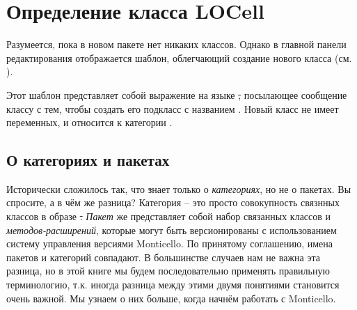 \documentclass[a4paper,10pt,twoside]{book}
\begin{document}
\section{Определение класса LOCell}

Разумеется, пока в новом пакете нет никаких классов. Однако в главной панели редактирования отображается шаблон, облегчающий создание нового класса (см. ).

Этот шаблон представляет собой выражение на языке \st, посылающее сообщение классу  с тем, чтобы создать его подкласс с названием . Новый класс не имеет переменных, и относится к категории .

\subsection{О категориях и пакетах}

Исторически сложилось так, что \st знает только о \emph{категориях}, но не о пакетах.
Вы спросите, а в чём же разница?
Категория -- это просто совокупность связнных классов в образе \st.
\emph{Пакет} же представляет собой набор связанных классов и \emph{методов-расширений}, которые могут быть версионированы с использованием систему управления версиями Monticello.
По принятому соглашению, имена пакетов и категорий совпадают.
В большинстве случаев нам не важна эта разница, но в этой книге мы будем последовательно применять правильную терминологию, т.к. иногда разница между этими двумя понятиями становится очень важной.
Мы узнаем о них больше, когда начнём работать с Monticello.
\end{document}
